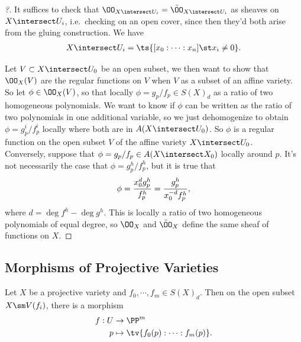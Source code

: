 \begin{proof}[?]

It suffices to check that
\(\OO_{X\intersect U_i} = \tilde \OO_{X\intersect U_i}\) as sheaves on
\(X\intersect U_i\), i.e.~checking on an open cover, since then they'd
both arise from the gluing construction. We have
\begin{align*}  
X\intersect U_i = \ts{[x_0 : \cdots: x_n] \st x_i \neq 0 }
.\end{align*}

Let \(V\subset X\intersect U_0\) be an open subset, we then want to show
that \(\OO_X(V)\) are the regular functions on \(V\) when \(V\) as a
subset of an affine variety. So let \(\phi\in \OO_X(V)\), so that
locally \(\phi = g_p/f_p \in S(X)_d\) as a ratio of two homogeneous
polynomials. We want to know if \(\phi\) can be written as the ratio of
two polynomials in one additional variable, so we just dehomogenize to
obtain \(\phi = g^i_p / f^i_p\) locally where both are in
\(A(X\intersect U_0)\). So \(\phi\) is a regular function on the open
subset \(V\) of the affine variety \(X\intersect U_0\).\\

Conversely, suppose that \(\phi = g_p/f_p \in A(X\intersect X_0)\)
locally around \(p\). It's not necessarily the case that
\(\phi = g^h_p / f^h_p\), but it is true that
\begin{align*}  
\phi = {x_0^d g_p^h \over f_p^h} = {g_p^h \over x_0^{-d} f_p^h}
,\end{align*} where \(d = \deg f^h - \deg g^h\). This is locally a ratio
of two homogeneous polynomials of equal degree, so \(\OO_X\) and
\(\tilde \OO_X\) define the same sheaf of functions on \(X\).

\end{proof}

\hypertarget{morphisms-of-projective-varieties}{%
\subsection{Morphisms of Projective
Varieties}\label{morphisms-of-projective-varieties}}

\begin{lemma}[?]

Let \(X\) be a projective variety and \(f_0, \cdots, f_m \in S(X)_d\).
Then on the open subset \(X\sm V(f_i)\), there is a morphism
\begin{align*}  
f: U &\to \PP^m \\
p &\mapsto \tv{f_0(p) : \cdots : f_m(p) }
.\end{align*}

\end{lemma}

